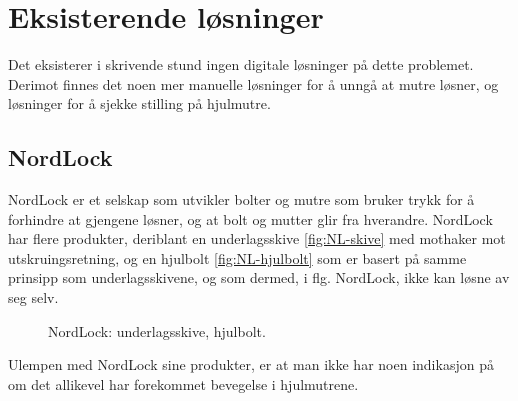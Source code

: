 \section{Eksisterende løsninger}
\label{sec:existing-solutions}
Det eksisterer i skrivende stund ingen digitale løsninger på dette problemet. 
Derimot finnes det noen mer manuelle løsninger for å unngå at mutre løsner, 
og løsninger for å sjekke stilling på hjulmutre.
\subsection{NordLock}
NordLock er et selskap som utvikler bolter og mutre som bruker trykk for å forhindre 
at gjengene løsner, og at bolt og mutter glir fra hverandre. NordLock har flere 
produkter, deriblant en underlagsskive \ref{fig:NL-skive}\cite{NL-skive} med mothaker mot 
utskruingsretning, og en hjulbolt 
\ref{fig:NL-hjulbolt} \cite{NL-hjulbolt} som er basert på samme prinsipp som 
underlagsskivene, og som dermed, i flg. NordLock, ikke kan løsne av seg selv.
\newline
\begin{figure}[H]
%
\hfill
{}%
\caption{NordLock: \protect{\ref{fig:NL-skive}} underlagsskive, \protect{\ref{fig:NL-hjulbolt}} hjulbolt.}
\end{figure}
Ulempen med NordLock sine produkter, er at man ikke har noen indikasjon på om 
det allikevel har forekommet bevegelse i hjulmutrene. 

